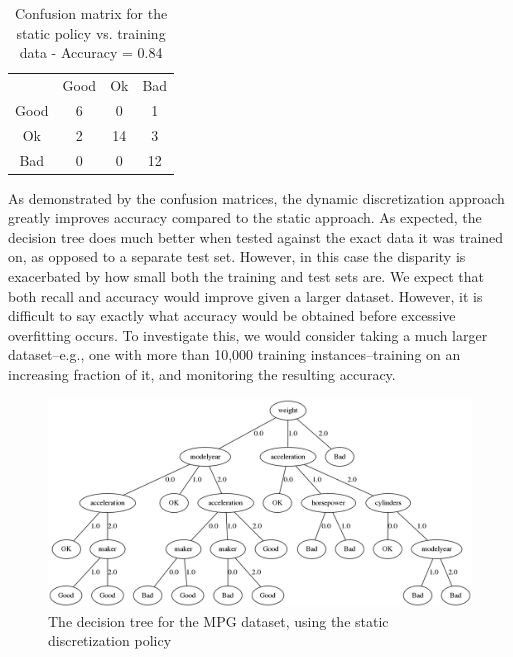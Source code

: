 \documentclass[12pt, conference, compsocconf]{IEEEtran}
\begin{document}
\begin{table}[h!]
\centering
\label{cm-static-training}
\begin{tabular}{cccc}
                          & Good                   & Ok                      & Bad                     \\ \cline{2-4} 
\multicolumn{1}{c|}{Good} & \multicolumn{1}{c|}{6} & \multicolumn{1}{c|}{0}  & \multicolumn{1}{c|}{1}  \\ \cline{2-4} 
\multicolumn{1}{c|}{Ok}   & \multicolumn{1}{c|}{2} & \multicolumn{1}{c|}{14} & \multicolumn{1}{c|}{3}  \\ \cline{2-4} 
\multicolumn{1}{c|}{Bad}  & \multicolumn{1}{c|}{0} & \multicolumn{1}{c|}{0}  & \multicolumn{1}{c|}{12} \\ \cline{2-4} 
\end{tabular}
\caption{Confusion matrix for the static policy vs. training data - Accuracy = 0.84}
\end{table}

As demonstrated by the confusion matrices, the dynamic discretization approach greatly improves accuracy compared to the static approach. 
As expected, the decision tree does much better when tested against the exact data it was trained on, as opposed to a separate test set. 
However, in this case the disparity is exacerbated by how small both the training and test sets are. 
We expect that both recall and accuracy would improve given a larger dataset. However, it is difficult to say exactly what accuracy would be obtained before excessive overfitting occurs. 
To investigate this, we would consider taking a much larger dataset--e.g., one with more than 10,000 training instances--training on an increasing fraction of it, and monitoring the resulting accuracy. 

\begin{figure}
  \includegraphics[width=\textwidth]{DT.png}
  \caption{The decision tree for the MPG dataset, using the static discretization policy}
\end{figure}
\end{document}
